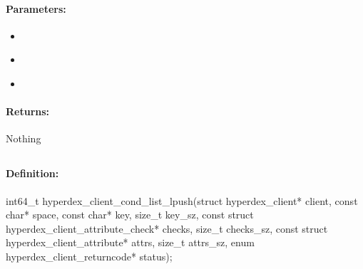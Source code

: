\paragraph{Parameters:}
\begin{itemize}[noitemsep]
\item {}\\

\item {}\\

\item {}\\

\end{itemize}

\paragraph{Returns:}
Nothing
\pagebreak
\subsection{}
\label{api:c:cond_list_lpush}


\paragraph{Definition:}
\begin{ccode}
int64_t hyperdex_client_cond_list_lpush(struct hyperdex_client* client,
        const char* space,
        const char* key, size_t key_sz,
        const struct hyperdex_client_attribute_check* checks, size_t checks_sz,
        const struct hyperdex_client_attribute* attrs, size_t attrs_sz,
        enum hyperdex_client_returncode* status);
\end{ccode}

